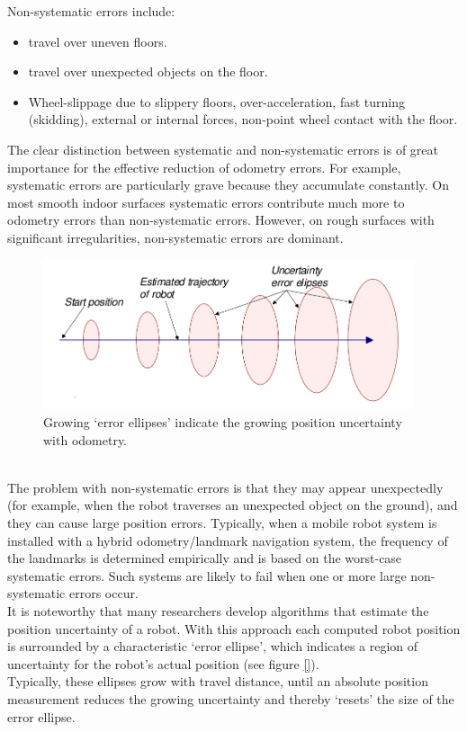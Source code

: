 Non-systematic errors include:

\begin{itemize}
\item travel over uneven floors.
\item travel over unexpected objects on the floor.
\item Wheel-slippage due to slippery floors, over-acceleration,
  fast turning (skidding), external or internal forces, non-point wheel
  contact with the floor.
\end{itemize}

The clear distinction between systematic and non-systematic errors is
of great importance for the effective reduction of odometry errors. For example,
systematic errors are particularly grave because they accumulate constantly.
On most smooth indoor surfaces systematic errors contribute much
more to odometry errors than non-systematic errors.
However, on rough surfaces with significant irregularities, non-systematic
errors are dominant.
\begin{figure} [h]
  \begin{center}
    \includegraphics[width=310pt]{img/odometry_error.png}
    \caption{Growing `error ellipses' indicate the growing position
      uncertainty with odometry.}
    \label{fig:odometry_error}
  \end{center}
\end{figure}
\\
The problem with non-systematic errors is that they may appear unexpectedly
(for example, when the robot traverses an unexpected object on the
ground), and they can cause large position errors. Typically, when a mobile
robot system is installed with a hybrid odometry/landmark navigation system,
the frequency of the landmarks is determined
empirically and is based on the worst-case systematic errors. Such systems
are likely to fail when one or more large non-systematic errors occur.
\\
It is noteworthy that many researchers develop algorithms that estimate
the position uncertainty of a robot. With this approach each computed robot
position is surrounded by a characteristic `error ellipse', which
indicates a region of uncertainty for the robot's actual position (see
figure \ref{}).
\\
Typically, these ellipses grow with travel distance, until an absolute
position measurement reduces the growing uncertainty and thereby `resets'
the size of the error ellipse.

